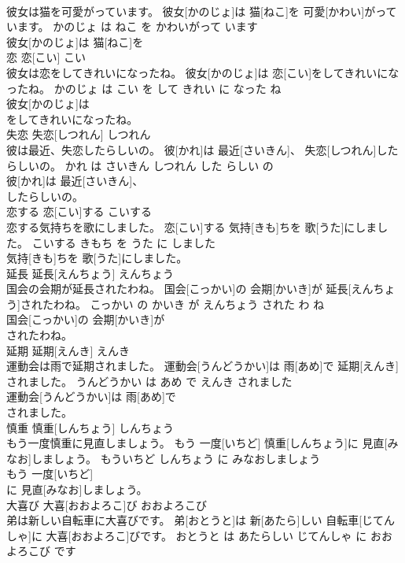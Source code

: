 \documentclass[8pt]{extreport}
\begin{document}
\begin{CJK}{UTF8}{min}
\\	彼女は猫を可愛がっています。	彼女[かのじょ]は 猫[ねこ]を 可愛[かわい]がっています。	かのじょ は ねこ を かわいがって います	
\\	彼女[かのじょ]は 猫[ねこ]を
\\	恋	恋[こい]	こい	
\\	彼女は恋をしてきれいになったね。	彼女[かのじょ]は 恋[こい]をしてきれいになったね。	かのじょ は こい を して きれい に なった ね	
\\	彼女[かのじょ]は
\\	をしてきれいになったね。			
\\	失恋	失恋[しつれん]	しつれん	
\\	彼は最近、失恋したらしいの。	彼[かれ]は 最近[さいきん]、 失恋[しつれん]したらしいの。	かれ は さいきん しつれん した らしい の	
\\	彼[かれ]は 最近[さいきん]、
\\	したらしいの。			
\\	恋する	恋[こい]する	こいする	
\\	恋する気持ちを歌にしました。	恋[こい]する 気持[きも]ちを 歌[うた]にしました。	こいする きもち を うた に しました	
\\	気持[きも]ちを 歌[うた]にしました。			
\\	延長	延長[えんちょう]	えんちょう	
\\	国会の会期が延長されたわね。	国会[こっかい]の 会期[かいき]が 延長[えんちょう]されたわね。	こっかい の かいき が えんちょう された わ ね	
\\	国会[こっかい]の 会期[かいき]が
\\	されたわね。			
\\	延期	延期[えんき]	えんき	
\\	運動会は雨で延期されました。	運動会[うんどうかい]は 雨[あめ]で 延期[えんき]されました。	うんどうかい は あめ で えんき されました	
\\	運動会[うんどうかい]は 雨[あめ]で
\\	されました。			
\\	慎重	慎重[しんちょう]	しんちょう	
\\	もう一度慎重に見直しましょう。	もう 一度[いちど] 慎重[しんちょう]に 見直[みなお]しましょう。	もういちど しんちょう に みなおしましょう	
\\	もう 一度[いちど]
\\	に 見直[みなお]しましょう。			
\\	大喜び	大喜[おおよろこ]び	おおよろこび	
\\	弟は新しい自転車に大喜びです。	弟[おとうと]は 新[あたら]しい 自転車[じてんしゃ]に 大喜[おおよろこ]びです。	おとうと は あたらしい じてんしゃ に おおよろこび です	

\end{CJK}
\end{document}
